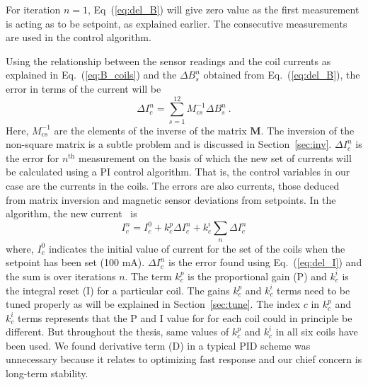 For iteration $n=1$, Eq~(\ref{eq:del_B}) will give zero value as the first measurement is acting as to be setpoint, as explained earlier. The consecutive measurements are used in the control algorithm. 

Using the relationship between the sensor readings and the coil currents as explained in Eq.~(\ref{eq:B_coils}) and the $\Delta B_s^n$ obtained from Eq.~(\ref{eq:del_B}), the error in terms of the current  will be
\begin{equation}\label{eq:del_I}
    \Delta I_c^n =\sum_{s=1}^{12} M^{-1}_{cs} \Delta B_s^n~\text{.}
\end{equation}
Here, $M^{-1}_{cs}$ are the elements of the inverse of the matrix $\bm{M}$. The inversion of the non-square matrix is a subtle problem and is discussed in Section~\ref{sec:inv}. $\Delta I_c^n$ is the error for $n^{\mathrm{th}}$ measurement on the basis of which the new set of currents will be calculated using a PI control algorithm. That is, the control variables in our case are the currents in the coils. The errors are also currents, those deduced from matrix inversion and magnetic sensor deviations from setpoints. In the algorithm, the new current~\cite{bea} is
\begin{equation}\label{eq:I}
    I^n_c=I^0_c+k^p_c \Delta I_c^n+k^i_c\sum_n \Delta I_c^n
\end{equation}
where, $I^0_c$ indicates the initial value of current for the set of the coils when the setpoint has been set (100 mA). $\Delta I_c^n$ is the error found using Eq.~(\ref{eq:del_I}) and the sum is over iterations $n$. The term $k^p_c$ is the proportional gain (P) and $k^i_c$ is the integral reset (I) for a particular coil. The gains $k^p_c$ and $k^i_c$ terms need to be tuned properly as will be explained in Section~\ref{sec:tune}. The index $c$ in $k^p_c$ and $k^i_c$ terms represents that the P and I value for for each coil could in principle be different. But throughout the thesis, same values of $k_c^p$ and $k_c^i$ in all six coils have been used. We found derivative term (D) in a typical PID scheme was unnecessary because it relates to optimizing fast response and our chief concern is long-term stability.


